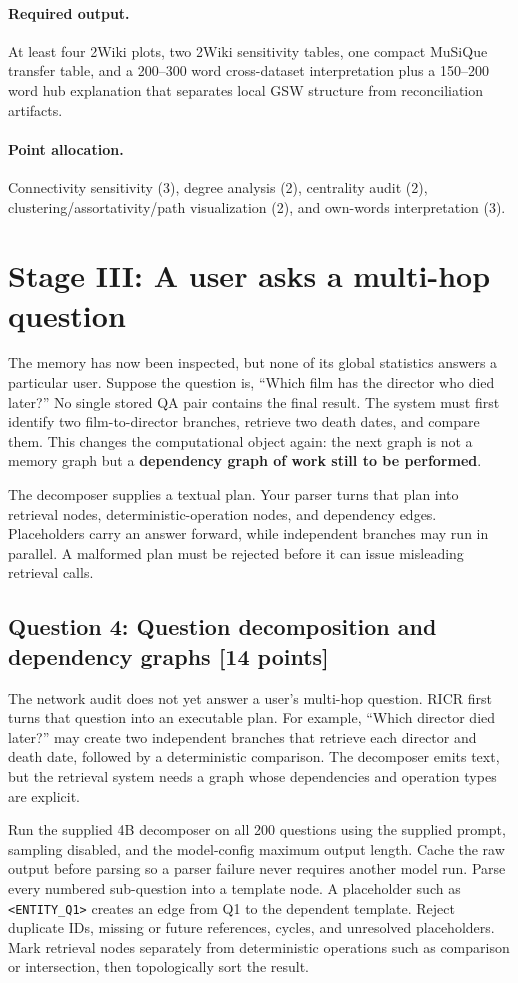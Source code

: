 \documentclass[11pt]{article}
\newcommand{\code}[1]{\texttt{#1}}
\newcommand{\RICR}{{\mdseries\textsc{RICR}}\xspace}
\newcommand{\question}[3]{%
  \subsection[Question #1: #2 (#3 points)]{Question #1: #2 \hfill [#3 points]}%
}
\newcommand{\deliverables}{\paragraph{Required output.}}
\newcommand{\grading}{\paragraph{Point allocation.}}
\begin{document}
\deliverables At least four 2Wiki plots, two 2Wiki sensitivity tables, one
compact MuSiQue transfer table, and a 200--300 word cross-dataset interpretation
plus a 150--200 word hub explanation that separates local GSW structure from
reconciliation artifacts.

\grading Connectivity sensitivity (3), degree analysis (2), centrality audit
(2), clustering/assortativity/path visualization (2), and own-words
interpretation (3).

\section{Stage III: A user asks a multi-hop question}

The memory has now been inspected, but none of its global statistics answers a
particular user. Suppose the question is, ``Which film has the director who
died later?'' No single stored QA pair contains the final result. The system
must first identify two film-to-director branches, retrieve two death dates,
and compare them. This changes the computational object again: the next graph
is not a memory graph but a \textbf{dependency graph of work still to be
performed}.

The decomposer supplies a textual plan. Your parser turns that plan into
retrieval nodes, deterministic-operation nodes, and dependency edges.
Placeholders carry an answer forward, while independent branches may run in
parallel. A malformed plan must be rejected before it can issue misleading
retrieval calls.

\question{4}{Question decomposition and dependency graphs}{14}

The network audit does not yet answer a user's multi-hop question. \RICR first
turns that question into an executable plan. For example, ``Which director
died later?'' may create two independent branches that retrieve each director
and death date, followed by a deterministic comparison. The decomposer emits
text, but the retrieval system needs a graph whose dependencies and operation
types are explicit.

Run the supplied 4B decomposer on all 200 questions using the supplied prompt,
sampling disabled, and the model-config maximum output length. Cache the raw
output before parsing so a parser failure never requires another model run.
Parse every numbered sub-question into a template node. A placeholder such as
\code{<ENTITY\_Q1>} creates an edge from Q1 to the dependent template. Reject
duplicate IDs, missing or future references, cycles, and unresolved
placeholders. Mark retrieval nodes separately from deterministic operations
such as comparison or intersection, then topologically sort the result.
\end{document}
